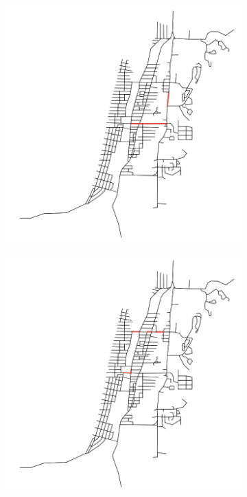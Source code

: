 \begin{figure}
    \centering
    \begin{subfigure}{0.475\textwidth}
        \centering
        \includegraphics[width=\textwidth]{images/analisi/comparison-base-critical-links.png}
        \caption{}
    \end{subfigure}
    \hfill
    \begin{subfigure}{0.475\textwidth}
        \centering
        \includegraphics[width=\textwidth]{images/analisi/comparison-new-critical-links.png}
        \caption{}
    \end{subfigure}
    \caption{}
    \label{fig:analisi-comparison-critical-links2}
\end{figure}

